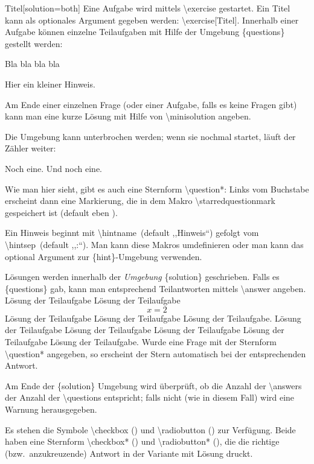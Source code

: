 \documentclass[hyperworksheet,pgfplots]{drcschool}
\newcommand*{\cs}[1]{\textup{\ttfamily\textbackslash#1}}                   %
\newcommand*{\opt}[1]{\textup{\ttfamily#1}}                                %
\newcommand*{\env}[1]{\textup{\ttfamily\{#1\}}}                            %
\begin{document}
\begin{worksheet}{Titel}[solution=both]
\exercise[Titel]\label{ex:foo}
Eine Aufgabe wird mittels \cs{exercise} gestartet.
Ein Titel kann als optionales Argument gegeben werden: \cs{exercise[Titel]}.
Innerhalb einer Aufgabe können einzelne Teilaufgaben mit Hilfe der Umgebung
\env{questions} gestellt werden:
\begin{questions}
\question Bla bla bla bla
\begin{hint}
Hier ein kleiner Hinweis.
\end{hint}
\question Am Ende einer einzelnen Frage (oder einer Aufgabe, falls es keine Fragen gibt)
   kann man eine kurze Lösung mit Hilfe von \cs{minisolution} angeben.
\end{questions}
Die Umgebung kann unterbrochen werden; wenn sie nochmal startet, läuft der Zähler
weiter:
\begin{questions}
\question* Noch eine.
\question Und noch eine.
\end{questions}
Wie man hier sieht, gibt es auch eine Sternform \cs{question*}:
Links vom Buchstabe erscheint dann eine Markierung, die in dem Makro
\cs{starredquestionmark} gespeichert ist (default eben \opt{*}).
\begin{hint}[Aufpassen!]
Ein Hinweis beginnt mit \cs{hintname}~(default ,,Hinweis``) gefolgt vom \cs{hintsep}~(default ,,:``).
Man kann diese Makros umdefinieren oder man kann das optional Argument zur \env{hint}-Umgebung
verwenden.
\end{hint}

\begin{solution}
Lösungen werden innerhalb der \emph{Umgebung} \env{solution} geschrieben.
Falls es \env{questions} gab, kann man entsprechend Teilantworten mittels \cs{answer}
angeben.
\answer Lösung der Teilaufgabe Lösung der Teilaufgabe
\[
x=2
\]
Lösung der Teilaufgabe Lösung der Teilaufgabe Lösung der Teilaufgabe.
\answer Lösung der Teilaufgabe Lösung der Teilaufgabe Lösung der Teilaufgabe Lösung der Teilaufgabe Lösung der Teilaufgabe.
\answer Wurde eine Frage mit der Sternform \cs{question*} angegeben, so erscheint der
Stern automatisch bei der entsprechenden Antwort.

Am Ende der \env{solution} Umgebung wird überprüft, ob die Anzahl der \cs{answer}s
der Anzahl der \cs{question}s entspricht; falls nicht (wie in diesem Fall) wird eine Warnung herausgegeben.
\end{solution}

Es stehen die Symbole \cs{checkbox} (\checkbox) und \cs{radiobutton} (\radiobutton)
zur Verfügung. Beide haben eine Sternform \cs{checkbox*} (\checkbox*) und
\cs{radiobutton*} (\radiobutton*), die die richtige (bzw.~anzukreuzende) Antwort
in der Variante mit Lösung druckt.


\end{worksheet}
\end{document}
